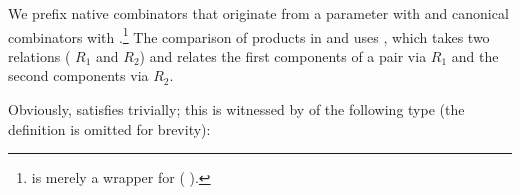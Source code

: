 We prefix native combinators that originate from a parameter with 
and canonical combinators with .\footnote{ is
merely a wrapper for ( ).}  The comparison of products
in  and  uses , which takes
two relations (\eg{} $R_{1}$ and $R_{2}$) and relates the first components of a
pair via $R_{1}$ and the second components via $R_{2}$.

Obviously,  satisfies  trivially; this is witnessed by
 of the following type (the definition is omitted for
brevity):
\begin{code}[hide]%
\>[0]\AgdaSpace{}%
\AgdaModule{\AgdaUnderscore{}}\AgdaSpace{}%
\AgdaSymbol{(}\AgdaSpace{}%
\AgdaSymbol{:}\AgdaSpace{}%
\AgdaSymbol{)}\AgdaSpace{}%
\<%
\end{code}
\begin{code}%
\>[0][@{}l@{\AgdaIndent{1}}]%
\>[2]\AgdaSpace{}%
\AgdaSymbol{:}\AgdaSpace{}%
\AgdaSpace{}%
\AgdaSpace{}%
\AgdaSymbol{(}\AgdaSpace{}%
\AgdaSymbol{)}\<%
\end{code}
